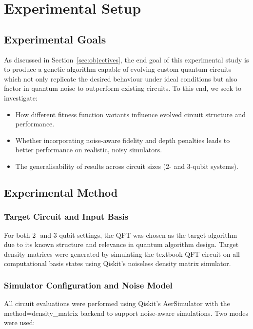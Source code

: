 \documentclass[11pt,a4paper]{article}
\begin{document}
\section{Experimental Setup} \label{sec:experimental}
\subsection{Experimental Goals}
As discussed in Section~\ref{sec:objectives}, the end goal of this experimental study is to produce a genetic algorithm capable of evolving custom quantum circuits which not only replicate the desired behaviour under ideal conditions but also factor in quantum noise to outperform existing circuits. To this end, we seek to investigate:
\begin{itemize}
    \item How different fitness function variants influence evolved circuit structure and performance.
    \item Whether incorporating noise-aware fidelity and depth penalties leads to better performance on realistic, noisy simulators.
    \item The generalisability of results across circuit sizes (2- and 3-qubit systems).
\end{itemize}

\subsection{Experimental Method}
\subsubsection*{Target Circuit and Input Basis}
For both 2- and 3-qubit settings, the QFT was chosen as the target algorithm due to its known structure and relevance in quantum algorithm design. Target density matrices were generated by simulating the textbook QFT circuit on all computational basis states using Qiskit's noiseless density matrix simulator.

\subsubsection*{Simulator Configuration and Noise Model}
All circuit evaluations were performed using Qiskit's AerSimulator with the method=density\_matrix backend to support noise-aware simulations. Two modes were used:
\end{document}
